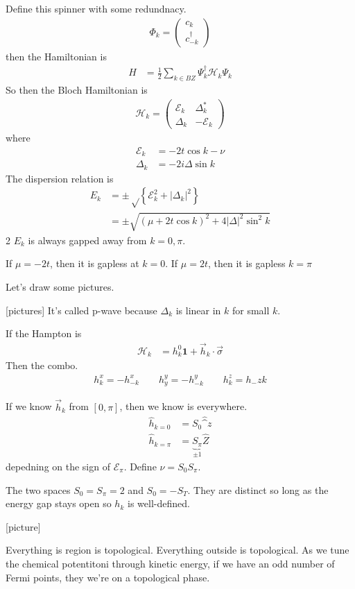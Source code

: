 Define this spinner with some redundnacy.
\begin{align}
    \Phi_k =
    \begin{pmatrix}
        c_k\\
        c_{-k}^\dagger
    \end{pmatrix}
\end{align}
then the Hamiltonian is
\begin{align}
    H &=
    \frac{1}{2}\sum_{k\in BZ}
    \Psi_k^\dagger \mathcal{H}_k \Psi_k
\end{align}
So then the Bloch Hamiltonian is
\begin{align}
    \mathcal{H}_k =
    \begin{pmatrix}
        \mathcal{E}_k & \Delta_k^*\\
        \Delta_k & -\mathcal{E}_k
    \end{pmatrix}
\end{align}
where
\begin{align}
    \mathcal{E}_k &= -2t\cos k - \nu\\
    \Delta_k &= -2i\Delta\sin k
\end{align}
The dispersion relation is
\begin{align}
    E_k &= \pm
    \sqrt\left\{ \mathcal{E}_k^2 + |\Delta_k|^2 \right\}\\
    &= \pm
    \sqrt{
        (\mu + 2t\cos k)^2
        + 4|\Delta|^2\sin^2 k
    }
\end{align}2
$E_k$ is always gapped away from $k=0,\pi$.

If $\mu=-2t$,
then it is gapless at $k=0$.
If $\mu=2t$,
then it is gapless $k=\pi$

Let's draw some pictures.

[pictures]
It's called p-wave because $\Delta_k$ is linear in $k$ for small $k$.

If the Hampton is
\begin{align}
    \mathcal{H}_k &=
    h_k^0 \mathbf{1}
    + \vec{h}_k \cdot \vec{\sigma}
\end{align}
Then the combo.
\begin{align}
    h_k^x = -h_{-k}^x
    \qquad
    h_y^y = -h_{-k}^y
    \qquad
    h_k^z = h_-zk
\end{align}

If we know $\vec{h}_k$ from $[0,\pi]$,
then we know is everywhere.
\begin{align}
    \hat{h}_{k=0} &= S_0 \hat^{z}\\
    \hat{h}_{k=\pi} &= \underbrace{S_{\pi}}_{\pm 1}\hat{Z}
\end{align}
depedning on the sign of $\mathcal{E}_\pi$.
Define $\nu = S_0 S_\pi$.

The two spaces $S_0 = S_{\pi}=2$
and $S_0 = -S_{T}$.
They are distinct so long as the energy gap stays open so $h_k$ is well-defined.

[picture]

Everything is region is topological.
Everything outside is topological.
As we tune the chemical potentitoni through kinetic energy,
if we have an odd number of Fermi points,
they we're on a topological phase.

